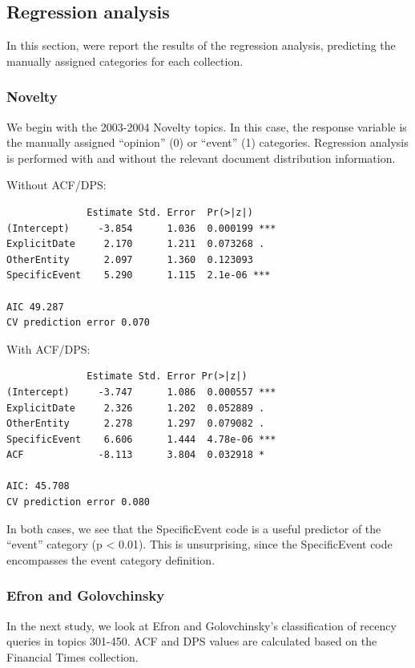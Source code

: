 \documentclass{sig-alternate}
\begin{document}
\subsection{Regression analysis}

In this section, were report the results of the regression analysis, predicting the manually assigned categories for each collection.

\subsubsection{Novelty}
We begin with the 2003-2004 Novelty topics. In this case, the response variable is the manually assigned ``opinion'' (0) or ``event'' (1) categories.  Regression analysis is performed with and without the relevant document distribution information.

Without ACF/DPS:
\begin{verbatim}
              Estimate Std. Error  Pr(>|z|)    
(Intercept)     -3.854      1.036  0.000199 ***
ExplicitDate     2.170      1.211  0.073268 .  
OtherEntity      2.097      1.360  0.123093    
SpecificEvent    5.290      1.115  2.1e-06 ***

AIC 49.287
CV prediction error 0.070
\end{verbatim}

With ACF/DPS:
\begin{verbatim}
              Estimate Std. Error Pr(>|z|)    
(Intercept)     -3.747      1.086  0.000557 ***
ExplicitDate     2.326      1.202  0.052889 .  
OtherEntity      2.278      1.297  0.079082 .  
SpecificEvent    6.606      1.444  4.78e-06 ***
ACF             -8.113      3.804  0.032918 *  

AIC: 45.708
CV prediction error 0.080
\end{verbatim}

In both cases, we see that the SpecificEvent code is a useful predictor of the ``event'' category (p < 0.01). This is unsurprising, since the SpecificEvent code encompasses the event category definition.

\subsubsection{Efron and Golovchinsky}

In the next study, we look at Efron and Golovchinsky's classification of recency queries in topics 301-450.  ACF and DPS values are calculated based on the Financial Times collection. 
\end{document}
